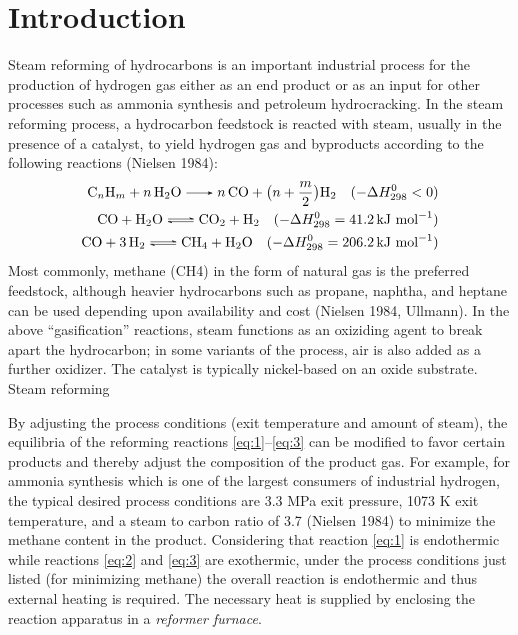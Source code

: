 \chapter{Introduction} \label{ch:introduction}

Steam reforming of hydrocarbons is an important industrial process for the production of hydrogen gas either as an end product or as an input for other processes such as ammonia synthesis and petroleum hydrocracking. In the steam reforming process, a hydrocarbon feedstock is reacted with steam, usually in the presence of a catalyst, to yield hydrogen gas and byproducts according to the following reactions (Nielsen 1984):
\begin{align}
\ce{C_{n}H_{m} + n H2O -> n CO + } \bigl(n + \frac{m}{2}\bigr) \ce{H2} \quad (-\Delta{}H^{0}_{298} < 0) \label{eq:1}\\
\ce{CO + H2O <=> CO2 + H2} \quad (-\Delta{}H^{0}_{298} = 41.2 \, \text{kJ mol}^{-1}) \label{eq:2}\\
\ce{CO + 3H2 <=> CH4 + H2O} \quad (-\Delta{}H^{0}_{298} = 206.2 \, \text{kJ mol}^{-1}) \label{eq:3}
\end{align}
Most commonly, methane (CH4) in the form of natural gas is the preferred feedstock, although heavier hydrocarbons such as propane, naphtha, and heptane can be used depending upon availability and cost (Nielsen 1984, Ullmann). In the above ``gasification'' reactions, steam functions as an oxiziding agent to break apart the hydrocarbon; in some variants of the process, air is also added as a further oxidizer. The catalyst is typically nickel-based on an oxide substrate. Steam reforming 

By adjusting the process conditions (exit temperature and amount of steam), the equilibria of the reforming reactions \ref{eq:1}--\ref{eq:3} can be modified to favor certain products and thereby adjust the composition of the product gas. For example, for ammonia synthesis which is one of the largest consumers of industrial hydrogen, the typical desired process conditions are 3.3 MPa exit pressure, 1073 K exit temperature, and a steam to carbon ratio of 3.7 (Nielsen 1984) to minimize the methane content in the product. Considering that reaction \ref{eq:1} is endothermic while reactions \ref{eq:2} and \ref{eq:3} are exothermic, under the process conditions just listed (for minimizing methane) the overall reaction is endothermic and thus external heating is required. The necessary heat is supplied by enclosing the reaction apparatus in a \emph{reformer furnace}.


